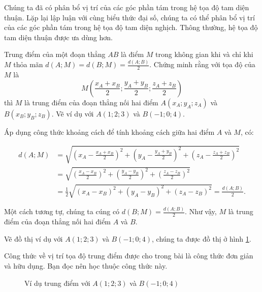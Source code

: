 \documentclass[a4paper, titlepage, openany]{book}
\newcounter{exercise}
\newcounter{solution}
\begin{document}
Chúng ta đã có phân bổ vị trí của các góc phần tám trong hệ tọa độ tam diện thuận. Lặp lại lập luận với cùng biểu thức đại số, chúng ta có thể phân bổ vị trí của các góc phần tám trong hệ tọa độ tam diện nghịch. Thông thường, hệ tọa độ tam diện thuận được ưa dùng hơn.

\exercise Trung điểm của một đoạn thẳng $AB$ là điểm $M$ trong không gian khi và chỉ khi $M$ thỏa mãn $d(A;M) = d(B;M) = \frac{d(A;B)}{2}$. Chứng minh rằng với tọa độ của $M$ là $$M\left(\frac{x_A+x_B}{2}; \frac{y_A+y_B}{2}; \frac{z_A+z_B}{2}\right)$$ thì $M$ là trung điểm của đoạn thẳng nối hai điểm $A(x_A; y_A; z_A)$ và $B(x_B; y_B; z_B)$. Vẽ ví dụ với $A(1;2;3)$ và $B(-1;0;4)$.

\solution

Áp dụng công thức khoảng cách để tính khoảng cách giữa hai điểm $A$ và $M$, có:

\begin{align*}
   d(A;M) &= \sqrt{\left(x_A - \frac{x_A+x_B}{2}\right)^2 + \left(y_A - \frac{y_A+y_B}{2}\right)^2 + \left(z_A - \frac{z_A+z_B}{2}\right)^2} \\
   &= \sqrt{\left(\frac{x_A-x_B}{2}\right)^2 + \left(\frac{y_A-y_B}{2}\right)^2 + \left(\frac{z_A-z_B}{2}\right)^2} \\
   &= \frac{1}{2} \sqrt{(x_A-x_B)^2 + (y_A-y_B)^2 + (z_A-z_B)^2} = \frac{d(A;B)}{2}.
\end{align*}

Một cách tương tự, chúng ta cúng có $d(B;M) = \frac{d(A;B)}{2}$. Như vậy, $M$ là trung điểm của đoạn thẳng nối hai điểm $A$ và $B$.

Vẽ đồ thị ví dụ với $A(1;2;3)$ và $B(-1;0;4)$, chúng ta được đồ thị ở hình \ref{fig:trung diem}.

Công thức về vị trí tọa độ trung điểm được cho trong bài là công thức đơn giản và hữu dụng. Bạn đọc nên học thuộc công thức này.

\begin{figure}[H]
   \centering
   \caption{Ví dụ trung điểm với $A(1;2;3)$ và $B(-1;0;4)$}
   \label{fig:trung diem}
\end{figure}
\end{document}
